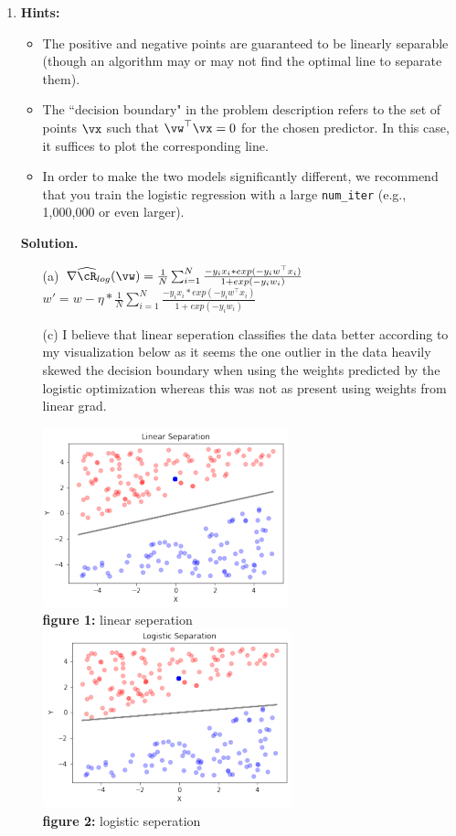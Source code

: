 \documentclass{article}
\def\hcR{\widehat{\cR}}
\theoremstyle{definition}
\theoremstyle{remark}
\newenvironment{Q}
{%
\clearpage
\item
}
{%
\phantom{s}%
\bigskip%
\noindent\textbf{Solution.}
}
\begin{document}
\begin{enumerate}[font={\Large\bfseries},left=0pt]
\begin{Q}
\begin{enumerate}
  \textbf{Hints:}
  \begin{itemize}
      \item The positive and negative points are guaranteed to be linearly separable (though an algorithm may or may not find the optimal line to separate them).
      \item The ``decision boundary" in the problem description refers to the set of points $\vx$ such that $\vw^\top \vx = 0$ for the chosen predictor. In this case, it suffices to plot the corresponding line.
      \item In order to make the two models significantly different, we recommend that you train the logistic regression with a large \texttt{num\_iter} (e.g., 1,000,000 or even larger).
  \end{itemize}
  \end{enumerate}
\end{Q}
\begin{enumerate}
  \item[(a)] $\nabla \hcR_{log}(\vw) = \frac{1}{N} \sum_{i=1}^{N} \frac{-y_ix_i*exp(-y_iw^\top x_i)}{1+exp(-y_iw_i)}$\\
  $w' = w- \eta*\frac{1}{N} \sum_{i=1}^{N} \frac{-y_ix_i*exp(-y_iw^\top x_i)}{1+exp(-y_iw_i)}$
  \item[(c)] I believe that linear seperation classifies the data better according to my
  visualization below as it seems the one outlier in the data heavily skewed the decision boundary when using 
  the weights predicted by the logistic optimization whereas this was not as present using weights from linear grad.
  \begin{center}
    \includegraphics[scale=0.95]{linSep.png}\\
    \textbf{figure 1:} linear seperation\\
    
    \includegraphics[scale=0.95]{logSep.png}\\
    \textbf{figure 2:} logistic seperation\\
  \end{center}


\end{enumerate}
\end{enumerate}
\end{document}
